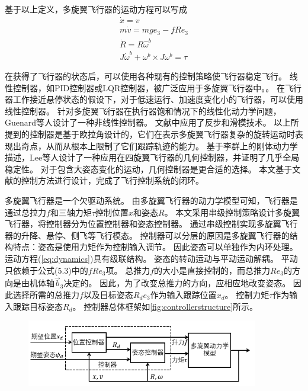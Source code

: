 \documentclass[
  type=master
]{gdutthesis}
\begin{document}
基于以上定义，多旋翼飞行器的运动方程可以写成\vspace{1ex}
\begin{gather}\label{eq:dynamics}
	\dot{x} = v\\
	m\dot{v} = mge_3 - fRe_3\\
	\dot{R} = R\hat{\omega}^b\\
	J\dot{\omega}^b + \omega^b \times J \omega^b = \tau
\end{gather}

在获得了飞行器的状态后，可以使用各种现有的控制策略使飞行器稳定飞行。
线性控制器，如PID控制器或LQR控制器，被广泛应用于多旋翼飞行器中\cite{mechali2022fixed,elkhatem2022robust}。。
在飞行器工作接近悬停状态的假设下，对于低速运行、加速度变化小的飞行器，可以使用线性控制器。
针对多旋翼飞行器在执行器饱和情况下的线性化动力学问题，Guenard等人设计了一种非线性控制器\cite{guenard2005dynamic}。
文献\parencite{bouabdallah2005backstepping}中应用了反步和滑模技术。
以上所提到的控制器是基于欧拉角设计的，它们在表示多旋翼飞行器复杂的旋转运动时表现出奇点，从而从根本上限制了它们跟踪轨迹的能力。
基于李群上的刚体动力学描述，Lee等人设计了一种应用在四旋翼飞行器的几何控制器，并证明了几乎全局稳定性\cite{lee2010geometric}。
对于包含大姿态变化的运动，几何控制器是更合适的选择。
本文基于文献\parencite{lee2010geometric}的控制方法进行设计，完成了飞行控制系统的闭环。


多旋翼飞行器是一个欠驱动系统。
由多旋翼飞行器的动力学模型可知，飞行器是通过总拉力$f$和三轴力矩$\tau$控制位置$x$和姿态$R$。
本文采用串级控制策略设计多旋翼飞行器，将控制器分为位置控制器和姿态控制器。
通过串级控制实现多旋翼飞行器的升降、悬停、侧飞等飞行模态。
控制器可以分层的原因是多旋翼飞行器的结构特点：姿态是使用力矩作为控制输入调节。
因此姿态可以单独作为内环处理。
运动方程(\autoref{eq:dynamics})具有级联结构。
姿态的转动运动与平动运动解耦。
平动只依赖于公式(5.3)中的$fRe_3$项。
总推力$f$的大小是直接控制的，而总推力$Re_3$的方向是由机体轴$\vec{b}_3$决定的。
因此，为了改变总推力的方向，应相应地改变姿态。
因此选择所需的总推力$f$以及目标姿态$R_d e_3$作为输入跟踪位置$x_d$。
控制力矩$\tau$作为输入跟踪目标姿态$R_d$。
控制器总体框架如\autoref{fig:controllerstructure}所示。
\begin{figure}[H]
	\centering
	\includegraphics[width=0.9\textwidth]{屏幕截图 2022-06-08 121234.png}
	\label{fig:controllerstructure}
\end{figure}
\end{document}
